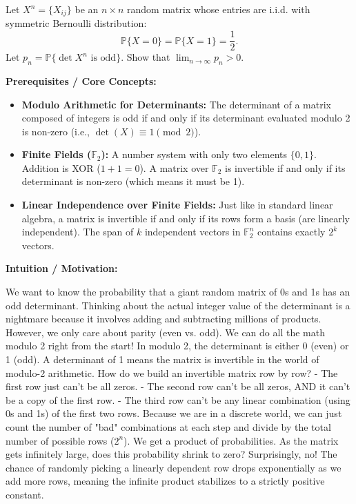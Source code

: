 \begin{exercise}\label{probability:2023:4}
Let $X^n = \{X_{ij}\}$ be an $n \times n$ random matrix whose entries are i.i.d. with symmetric Bernoulli distribution:
\[
\mathbb{P}\{X = 0\} = \mathbb{P}\{X = 1\} = \frac{1}{2}.
\]
Let $p_n = \mathbb{P}\{\det X^n \text{ is odd}\}$. Show that $\lim_{n \to \infty} p_n > 0$.
\end{exercise}

\begin{solution}
\textbf{Prerequisites / Core Concepts:}
\begin{itemize}
    \item \textbf{Modulo Arithmetic for Determinants:} The determinant of a matrix composed of integers is odd if and only if its determinant evaluated modulo 2 is non-zero (i.e., $\det(X) \equiv 1 \pmod 2$).
    \item \textbf{Finite Fields ($\mathbb{F}_2$):} A number system with only two elements $\{0, 1\}$. Addition is XOR ($1+1=0$). A matrix over $\mathbb{F}_2$ is invertible if and only if its determinant is non-zero (which means it must be 1).
    \item \textbf{Linear Independence over Finite Fields:} Just like in standard linear algebra, a matrix is invertible if and only if its rows form a basis (are linearly independent). The span of $k$ independent vectors in $\mathbb{F}_2^n$ contains exactly $2^k$ vectors.
\end{itemize}

\textbf{Intuition / Motivation:}

We want to know the probability that a giant random matrix of 0s and 1s has an odd determinant.
Thinking about the actual integer value of the determinant is a nightmare because it involves adding and subtracting millions of products.
However, we only care about parity (even vs. odd). We can do all the math modulo 2 right from the start! In modulo 2, the determinant is either 0 (even) or 1 (odd). A determinant of 1 means the matrix is invertible in the world of modulo-2 arithmetic.
How do we build an invertible matrix row by row?
- The first row just can't be all zeros.
- The second row can't be all zeros, AND it can't be a copy of the first row.
- The third row can't be any linear combination (using 0s and 1s) of the first two rows.
Because we are in a discrete world, we can just count the number of "bad" combinations at each step and divide by the total number of possible rows ($2^n$). We get a product of probabilities. As the matrix gets infinitely large, does this probability shrink to zero? Surprisingly, no! The chance of randomly picking a linearly dependent row drops exponentially as we add more rows, meaning the infinite product stabilizes to a strictly positive constant.


\end{solution}

